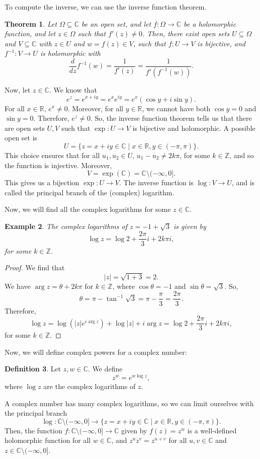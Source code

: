 \documentclass[a4paper, openany]{memoir}
\theoremstyle{definition}
\newtheorem{definition}{Definition}[section]
\theoremstyle{plain}
\newtheorem{theorem}[definition]{Theorem}
\newtheorem{example}[definition]{Example}
\begin{document}
To compute the inverse, we can use the inverse function theorem.
\begin{theorem}
Let $\Omega \subseteq \mathbb{C}$ be an open set, and let $f: \Omega \to \mathbb{C}$ be a holomorphic function, and let $z \in \Omega$ such that $f'(z) \neq 0$. Then, there exist open sets $U \subseteq \Omega$ and $V \subseteq \mathbb{C}$ with $z \in U$ and $w = f(z) \in V$, such that $f: U \to V$ is bijective, and $f^{-1}: V \to U$ is holomorphic with
\[\frac{d}{dz} f^{-1}(w) = \frac{1}{f'(z)} = \frac{1}{f'(f^{-1}(w))}.\]
\end{theorem}
\noindent Now, let $z \in \mathbb{C}$. We know that
\[e^z = e^{x + iy} = e^x e^{iy} = e^x (\cos y + i \sin y).\]
For all $x \in \mathbb{R}$, $e^x \neq 0$. Moreover, for all $y \in \mathbb{R}$, we cannot have both $\cos y = 0$ and $\sin y = 0$. Therefore, $e^z \neq 0$. So, the inverse function theorem tells us that there are open sets $U, V$ such that $\exp: U \to V$ is bijective and holomorphic. A possible open set is
\[U = \{z = x + iy \in \mathbb{C} \mid x \in \mathbb{R}, y \in (-\pi, \pi)\}.\]
This choice ensures that for all $u_1, u_2 \in U$, $u_1 - u_2 \neq 2k\pi$, for some $k \in \mathbb{Z}$, and so the function is injective. Moreover,
\[V = \exp(\mathbb{C}) = \mathbb{C} \setminus (-\infty, 0].\]
This gives us a bijection $\exp: U \to V$. The inverse function is $\log: V \to U$, and is called the principal branch of the (complex) logarithm.

Now, we will find all the complex logarithms for some $z \in \mathbb{C}$.
\begin{example}
The complex logarithms of $z = -1 + \sqrt{3}$ is given by
\[\log z = \log 2 + \frac{2\pi}{3}i + 2k\pi i,\]
for some $k \in \mathbb{Z}$.
\end{example}
\begin{proof}
We find that
\[|z| = \sqrt{1 + 3} = 2.\]
We have $\arg z = \theta + 2k \pi$ for $k \in \mathbb{Z}$, where $\cos \theta = -1$ and $\sin \theta = \sqrt{3}$. So,
\[\theta = \pi - \tan^{-1} \sqrt{3} = \pi - \frac{\pi}{3} = \frac{2\pi}{3}.\]
Therefore,
\[\log z = \log (|z| e^{i \arg z}) + \log |z| + i \arg z = \log 2 + \frac{2\pi}{3} i + 2k \pi i,\]
for some $k \in \mathbb{Z}$.
\end{proof}

Now, we will define complex powers for a complex number:
\begin{definition}
Let $z, w \in \mathbb{C}$. We define 
\[z^w = e^{w \log z},\]
where $\log z$ are the complex logarithms of $z$.
\end{definition}
\noindent A complex number has many complex logarithms, so we can limit ourselves with the principal branch
\[\log: \mathbb{C} \setminus (-\infty, 0] \to \{z = x + iy \in \mathbb{C} \mid x \in \mathbb{R}, y \in (-\pi, \pi)\}.\]
Then, the function $f: \mathbb{C} \setminus (-\infty, 0] \to \mathbb{C}$ given by $f(z) = z^w$ is a well-defined holomorphic function for all $w \in \mathbb{C}$, and $z^u z^v = z^{u + v}$ for all $u, v \in \mathbb{C}$ and $z \in \mathbb{C} \setminus (-\infty, 0]$.
\end{document}
